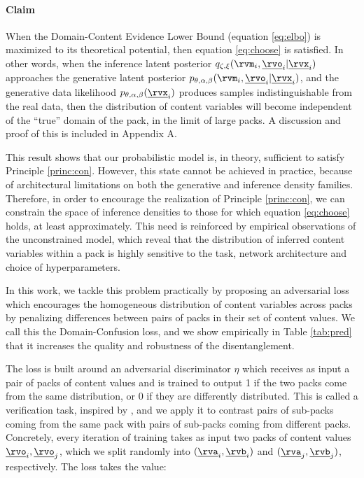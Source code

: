 \documentclass{article} %
\begin{document}
\paragraph{Claim} When the Domain-Content Evidence Lower Bound (equation \ref{eq:elbo}) is maximized to its theoretical potential, then equation \ref{eq:choose} is satisfied. In other words, when the inference latent posterior $q_{\zeta, \xi}(\rvm_i, \underline{\rvo}_i | \underline{\rvx}_i)$ approaches the generative latent posterior $p_{\theta, \alpha, \beta}(\rvm_i, \underline{\rvo}_i | \underline{\rvx}_i)$, and the generative data likelihood $p_{\theta, \alpha, \beta} (\underline{\rvx}_i)$ produces samples indistinguishable from the real data, then the distribution of content variables will become independent of the ``true'' domain of the pack, in the limit of large packs. A discussion and proof of this is included in Appendix A.

This result shows that our probabilistic model is, in theory, sufficient to satisfy Principle \ref{princ:con}. However, this state cannot be achieved in practice, because of architectural limitations on both the generative and inference density families. Therefore, in order to encourage the realization of Principle \ref{princ:con}, we can constrain the space of inference densities to those for which equation \ref{eq:choose} holds, at least approximately. This need is reinforced by empirical observations of the unconstrained model, which reveal that the distribution of inferred content variables within a pack is highly sensitive to the task, network architecture and choice of hyperparameters.

In this work, we tackle this problem practically by proposing an adversarial loss which encourages the homogeneous distribution of content variables across packs by penalizing differences between pairs of packs in their set of content values. We call this the Domain-Confusion loss, and we show empirically in Table \ref{tab:pred} that it increases the quality and robustness of the disentanglement. 

The loss is built around an adversarial discriminator $\eta$ which receives as input a pair of packs of content values and is trained to output 1 if the two packs come from the same distribution, or 0 if they are differently distributed. This is called a verification task, inspired by \citet{sohn2018unsupervised}, and we apply it to contrast pairs of sub-packs coming from the same pack with pairs of sub-packs coming from different packs. Concretely, every iteration of training takes as input two packs of content values $\underline{\rvo}_i, \underline{\rvo}_j$, which we split randomly into $(\underline{\rva}_i, \underline{\rvb}_i)$ and $(\underline{\rva}_j,\underline{\rvb}_j)$, respectively. The loss takes the value:
\end{document}
